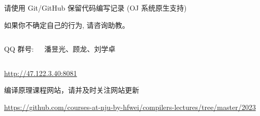 \begin{frame}
  \begin{center}
    请使用 Git/GitHub 保留代码编写记录 (OJ 系统原生支持)

    \vspace{0.50cm}
    如果你不确定自己的行为, 请咨询助教。
  \end{center}
\end{frame}

\begin{frame}{}
  \begin{columns}
    \begin{center}
      QQ 群号: 

    \end{center}
    \begin{center}
      {\bf {}} 潘昱光、顾龙、刘学卓
    \end{center}
  \end{columns}
\end{frame}

\begin{frame}{}
  \begin{center}
    \url{http://47.122.3.40:8081} \\[5pt]


    编译原理课程网站，请并及时关注网站更新
  \end{center}
\end{frame}

\begin{frame}{}
  \begin{center}

    \vspace{0.50cm}
    \url{https://github.com/courses-at-nju-by-hfwei/compilers-lectures/tree/master/2023}
  \end{center}
\end{frame}

\begin{frame}{}
  \begin{center}
  \end{center}
\end{frame}

